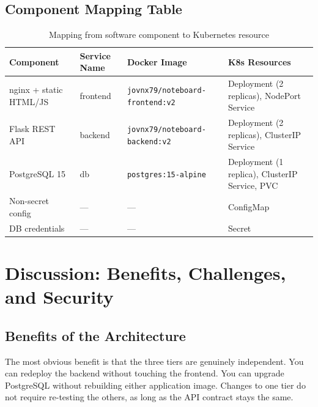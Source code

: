 \documentclass[12pt,a4paper]{article}
\begin{document}
\subsection{Component Mapping Table}

\begin{table}[h]
\centering
\small
\begin{tabular}{@{}p{3.2cm}p{2.2cm}p{4.2cm}p{4cm}@{}}
\toprule
\textbf{Component} & \textbf{Service Name} & \textbf{Docker Image} & \textbf{K8s Resources} \\
\midrule
nginx + static HTML/JS & frontend & \texttt{jovnx79/noteboard-} \newline \texttt{frontend:v2} & Deployment (2 replicas), NodePort Service \\
Flask REST API         & backend  & \texttt{jovnx79/noteboard-} \newline \texttt{backend:v2}  & Deployment (2 replicas), ClusterIP Service \\
PostgreSQL 15          & db       & \texttt{postgres:15-alpine}   & Deployment (1 replica), ClusterIP Service, PVC \\
Non-secret config      & ---      & ---                           & ConfigMap \\
DB credentials         & ---      & ---                           & Secret \\
\bottomrule
\end{tabular}
\caption{Mapping from software component to Kubernetes resource}
\end{table}

\section{Discussion: Benefits, Challenges, and Security}

\subsection{Benefits of the Architecture}

The most obvious benefit is that the three tiers are genuinely independent. You can redeploy the backend without touching the frontend. You can upgrade PostgreSQL without rebuilding either application image. Changes to one tier do not require re-testing the others, as long as the API contract stays the same.
\end{document}
